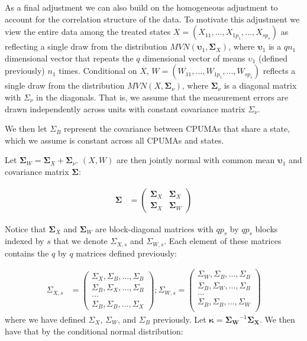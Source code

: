 As a final adjustment we can also build on the homogeneous adjustment to account for the correlation structure of the data. To motivate this adjustment we view the entire data among the treated states $X = (X_{11}, ..., X_{1p_1}, ..., X_{sp_s})$ as reflecting a single draw from the distribution $MVN(\boldsymbol{\upsilon}_1, \mathbf{\Sigma}_X)$, where $\boldsymbol{\upsilon}_1$ is a $qn_1$ dimensional vector that repeats the $q$ dimensional vector of means $\upsilon_1$ (defined previously) $n_1$ times. Conditional on $X$, $W = (W_{11}, ..., W_{1p_1}, ..., W_{sp_s})$ reflects a single draw from the distribution $MVN(X, \boldsymbol{\Sigma}_{\nu})$, where $\boldsymbol{\Sigma}_{\nu}$ is a diagonal matrix with $\Sigma_{\nu}$ in the diagonals. That is, we assume that the measurement errors are drawn independently across units with constant covariance matrix $\Sigma_{\nu}$.

We then let $\Sigma_B$ represent the covariance between CPUMAs that share a state, which we assume is constant across all CPUMAs and states. 

Let $\boldsymbol{\Sigma}_W = \boldsymbol{\Sigma}_X + \boldsymbol{\Sigma}_{\nu}$. $(X, W)$ are then jointly normal with common mean $\boldsymbol{\upsilon}_1$ and covariance matrix $\boldsymbol{\Sigma}$: 

\begin{align}\label{eqn:xcormodel}
\boldsymbol{\Sigma} &= \begin{pmatrix}
\mathbf{\Sigma}_X & \mathbf{\Sigma}_X \\
\mathbf{\Sigma}_X & \mathbf{\Sigma}_W
\end{pmatrix} 
\end{align}

Notice that $\mathbf{\Sigma}_X$ and $\mathbf{\Sigma}_W$ are block-diagonal matrices with $qp_s$ by $qp_s$ blocks indexed by $s$ that we denote $\Sigma_{X, s}$ and $\Sigma_{W, s}$. Each element of these matrices contains the $q$ by $q$ matrices defined previously: 

\begin{align}\label{eqn:xcormodel2}
\Sigma_{X, s} &= \begin{pmatrix}
\Sigma_{X}, \Sigma_B, ..., \Sigma_B \\
\Sigma_B, \Sigma_{X}, ..., \Sigma_B \\
... \\
\Sigma_B, \Sigma_B, ..., \Sigma_{X}
\end{pmatrix};
\Sigma_{W, s} = \begin{pmatrix}
\Sigma_{W}, \Sigma_B, ..., \Sigma_B \\
\Sigma_B, \Sigma_{W}, ..., \Sigma_B \\
... \\
\Sigma_B, \Sigma_B, ..., \Sigma_{W} \\
\end{pmatrix}
\end{align}
%
where we have defined $\Sigma_{X}$, $\Sigma_{W}$, and $\Sigma_B$ previously. 
Let $\boldsymbol{\kappa} = \mathbf{\Sigma_W}^{-1}\mathbf{\Sigma_X}$. We then have that by the conditional normal distribution:

